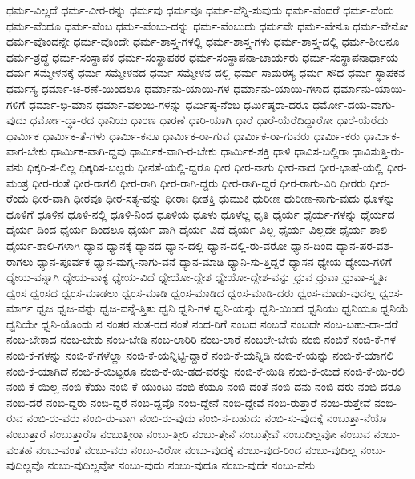 {ಧರ್ಮ-ವಿಲ್ಲದೆ
ಧರ್ಮ-ವೀರ-ರನ್ನು
ಧರ್ಮವು
ಧರ್ಮವೂ
ಧರ್ಮ-ವೆನ್ನಿ-ಸುವುದು
ಧರ್ಮ-ವೆಂದರೆ
ಧರ್ಮ-ವೆಂದು
ಧರ್ಮ-ವೆಂದೂ
ಧರ್ಮ-ವೆಂಬ
ಧರ್ಮ-ವೆಂಬು-ದನ್ನು
ಧರ್ಮ-ವೆಂಬುದು
ಧರ್ಮವೇ
ಧರ್ಮ-ವೇನೂ
ಧರ್ಮ-ವೇನೋ
ಧರ್ಮ-ವೊಂದನ್ನೇ
ಧರ್ಮ-ವೊಂದೇ
ಧರ್ಮ-ಶಾಸ್ತ್ರ-ಗಳಲ್ಲಿ
ಧರ್ಮ-ಶಾಸ್ತ್ರ-ಗಳು
ಧರ್ಮ-ಶಾಸ್ತ್ರ-ದಲ್ಲಿ
ಧರ್ಮ-ಶೀಲನೂ
ಧರ್ಮ-ಶ್ರದ್ಧೆ
ಧರ್ಮ-ಸಂಸ್ಥಾಪಕ
ಧರ್ಮ-ಸಂಸ್ಥಾಪಕರ
ಧರ್ಮ-ಸಂಸ್ಥಾಪನಾ-ಚಾರ್ಯರು
ಧರ್ಮ-ಸಂಸ್ಥಾಪನಾರ್ಥಾಯ
ಧರ್ಮ-ಸಮ್ಮೇಳನಕ್ಕೆ
ಧರ್ಮ-ಸಮ್ಮೇಳನದ
ಧರ್ಮ-ಸಮ್ಮೇಳನ-ದಲ್ಲಿ
ಧರ್ಮ-ಸಾಮರಸ್ಯ
ಧರ್ಮ-ಸೌಧ
ಧರ್ಮ-ಸ್ಥಾಪಕನ
ಧರ್ಮಸ್ಯ
ಧರ್ಮಾ-ಚ-ರಣೆ-ಯಿಂದಲೂ
ಧರ್ಮಾನು-ಯಾಯಿ-ಗಳ
ಧರ್ಮಾನು-ಯಾಯಿ-ಗಳಾದ
ಧರ್ಮಾನು-ಯಾಯಿ-ಗಳಿಗೆ
ಧರ್ಮಾ-ಭಿ-ಮಾನ
ಧರ್ಮಾ-ವಲಂಬಿ-ಗಳನ್ನು
ಧರ್ಮಿಷ್ಠ-ನೆಂಬ
ಧರ್ಮಿಷ್ಠರಾ-ದರೂ
ಧರ್ಮೋ-ದಯ-ವಾಗು-ವುದು
ಧರ್ಮೋ-ದ್ಧಾ-ರದ
ಧಾನಿಯ
ಧಾರಣ
ಧಾರಣೆ
ಧಾರಿ-ಯಾಗಿ
ಧಾರೆ
ಧಾರೆ-ಯೆರೆದಿದ್ದಾರೋ
ಧಾರೆ-ಯೆರೆದು
ಧಾರ್ಮಿಕ
ಧಾರ್ಮಿಕ-ತೆ-ಗಳು
ಧಾರ್ಮಿ-ಕನೂ
ಧಾರ್ಮಿಕ-ರಾ-ಗುವ
ಧಾರ್ಮಿಕ-ರಾ-ಗುವರು
ಧಾರ್ಮಿ-ಕರು
ಧಾರ್ಮಿಕ-ವಾಗ-ಬೇಕು
ಧಾರ್ಮಿಕ-ವಾಗಿ-ದ್ದವು
ಧಾರ್ಮಿಕ-ವಾಗಿ-ರ-ಬೇಕು
ಧಾರ್ಮಿಕ-ಶಕ್ತಿ
ಧಾಳಿ
ಧಾವಿಸ-ಬಲ್ಲಿರಾ
ಧಾವಿಸುತ್ತಿ-ರು-ವನು
ಧಿಕ್ಕರಿ-ಸ-ಲಿಲ್ಲ
ಧಿಕ್ಕರಿಸ-ಬಲ್ಲರು
ಧೀನತೆ-ಯಲ್ಲಿ-ದ್ದರೂ
ಧೀರ
ಧೀರ-ನಾಗು
ಧೀರ-ನಾದ
ಧೀರ-ಭಾಷೆ-ಯಲ್ಲಿ
ಧೀರ-ಮಂತ್ರ
ಧೀರ-ರಂತೆ
ಧೀರ-ರಾಗಲಿ
ಧೀರ-ರಾಗಿ
ಧೀರ-ರಾಗಿ-ದ್ದರು
ಧೀರ-ರಾಗಿ-ದ್ದರೆ
ಧೀರ-ರಾಗು-ವಿರಿ
ಧೀರರು
ಧೀರ-ರೆಂದು
ಧೀರ-ವಾಗಿ
ಧೀರವೂ
ಧೀರ-ಸತ್ಯ-ವನ್ನು
ಧೀರಾಃ
ಧೀಶಕ್ತಿ
ಧುಮುಕಿ
ಧುರೀಣ
ಧುರೀಣ-ನಾಗು-ವುದು
ಧೂಳನ್ನು
ಧೂಳಿಗೆ
ಧೂಳಿನ
ಧೂಳಿ-ನಲ್ಲಿ
ಧೂಳಿ-ನಿಂದ
ಧೂಳಿಯ
ಧೂಳು
ಧೂಳೆಲ್ಲ
ಧೃತಿ
ಧೈರ್ಯ
ಧೈರ್ಯ-ಗಳನ್ನು
ಧೈರ್ಯದ
ಧೈರ್ಯ-ದಿಂದ
ಧೈರ್ಯ-ದಿಂದಲೂ
ಧೈರ್ಯ-ವಾಗಿ
ಧೈರ್ಯ-ವಿದೆ
ಧೈರ್ಯ-ವಿಲ್ಲ
ಧೈರ್ಯ-ವಿಲ್ಲದೇ
ಧೈರ್ಯ-ಶಾಲಿ
ಧೈರ್ಯ-ಶಾಲಿ-ಗಳಾಗಿ
ಧ್ಯಾನ
ಧ್ಯಾನಕ್ಕೆ
ಧ್ಯಾನದ
ಧ್ಯಾನ-ದಲ್ಲಿ
ಧ್ಯಾನ-ದಲ್ಲಿ-ರು-ವರೋ
ಧ್ಯಾನ-ದಿಂದ
ಧ್ಯಾನ-ಪರ-ವಶ-ರಾಗಲು
ಧ್ಯಾನ-ಪೂರ್ವಕ
ಧ್ಯಾನ-ಮಗ್ನ-ನಾಗು-ವನೆ
ಧ್ಯಾನ-ಮಾಡಿ
ಧ್ಯಾನಿ-ಸು-ತ್ತಿದ್ದರೆ
ಧ್ಯಾಸನ
ಧ್ಯೇಯ
ಧ್ಯೇಯ-ಗಳಿಗೆ
ಧ್ಯೇಯ-ವನ್ನಾಗಿ
ಧ್ಯೇಯ-ವಾಕ್ಯ
ಧ್ಯೇಯ-ವಿದೆ
ಧ್ಯೇಯೋ-ದ್ದೇಶ
ಧ್ಯೇಯೋ-ದ್ದೇಶ-ವನ್ನು
ಧ್ರುವ
ಧ್ರುವಾ
ಧ್ರುವಾ-ಸ್ಮೃತಿಃ
ಧ್ವಂಸ
ಧ್ವಂಸದ
ಧ್ವಂಸ-ಮಾಡಲು
ಧ್ವಂಸ-ಮಾಡಿ
ಧ್ವಂಸ-ಮಾಡಿದ
ಧ್ವಂಸ-ಮಾಡಿ-ದರು
ಧ್ವಂಸ-ಮಾಡು-ವುದಲ್ಲ
ಧ್ವಂಸ-ಮಾರ್ಗ
ಧ್ವಜ
ಧ್ವಜ-ವನ್ನು
ಧ್ವಜ-ವನ್ನೆ-ತ್ತಿತು
ಧ್ವನಿ
ಧ್ವನಿ-ಗಳ
ಧ್ವನಿ-ಯನ್ನು
ಧ್ವನಿ-ಯಿಂದ
ಧ್ವನಿಯು
ಧ್ವನಿಯೂ
ಧ್ವನಿಯೆ
ಧ್ವನಿಯೇ
ಧ್ವನಿ-ಯೊಂದು
ನ
ನಂತರ
ನಂತ-ರದ
ನಂತೆ
ನಂದ-ರಿಗೆ
ನಂಬದ
ನಂಬದೆ
ನಂಬದೇ
ನಂಬ-ಬಹು-ದಾ-ದರೆ
ನಂಬ-ಬೇಕಾದ
ನಂಬ-ಬೇಕು
ನಂಬ-ಬೇಡಿ
ನಂಬ-ಲಾರಿರಿ
ನಂಬ-ಲಾರೆ
ನಂಬಲೇ-ಬೇಕು
ನಂಬಿ
ನಂಬಿಕೆ
ನಂಬಿ-ಕೆ-ಗಳ
ನಂಬಿ-ಕೆ-ಗಳನ್ನು
ನಂಬಿ-ಕೆ-ಗಳೆಲ್ಲಾ
ನಂಬಿ-ಕೆ-ಯನ್ನಿಟ್ಟಿ-ದ್ದಾರೆ
ನಂಬಿ-ಕೆ-ಯನ್ನಿಡಿ
ನಂಬಿ-ಕೆ-ಯನ್ನು
ನಂಬಿ-ಕೆ-ಯಾಗಲಿ
ನಂಬಿ-ಕೆ-ಯಾಗಿದೆ
ನಂಬಿ-ಕೆ-ಯಿಟ್ಟರೂ
ನಂಬಿ-ಕೆ-ಯಿ-ಡದ-ವರನ್ನು
ನಂಬಿ-ಕೆ-ಯಿಡಿ
ನಂಬಿ-ಕೆ-ಯಿದೆ
ನಂಬಿ-ಕೆ-ಯಿ-ರಲಿ
ನಂಬಿ-ಕೆ-ಯಿಲ್ಲ
ನಂಬಿ-ಕೆಯು
ನಂಬಿ-ಕೆ-ಯುಂಟು
ನಂಬಿ-ಕೆಯೂ
ನಂಬಿ-ದಂತೆ
ನಂಬಿ-ದನು
ನಂಬಿ-ದರು
ನಂಬಿ-ದರೂ
ನಂಬಿ-ದರೆ
ನಂಬಿ-ದ್ದರು
ನಂಬಿ-ದ್ದರೆ
ನಂಬಿ-ದ್ದವೊ
ನಂಬಿ-ದ್ದೇನೆ
ನಂಬಿ-ದ್ದೇವೆ
ನಂಬಿ-ರುತ್ತಾರೆ
ನಂಬಿ-ರುತ್ತೇವೆ
ನಂಬಿ-ರುವ
ನಂಬಿ-ರು-ವರು
ನಂಬಿ-ರು-ವಾಗ
ನಂಬಿ-ರು-ವುದು
ನಂಬಿ-ಸ-ಬಹುದು
ನಂಬಿ-ಸು-ವುದಕ್ಕೆ
ನಂಬುತ್ತಾ-ನೆಯೊ
ನಂಬುತ್ತಾರೆ
ನಂಬುತ್ತಾರೊ
ನಂಬುತ್ತೀರಾ
ನಂಬು-ತ್ತೀರಿ
ನಂಬು-ತ್ತೇನೆ
ನಂಬುತ್ತೇವೆ
ನಂಬುದಿಲ್ಲವೋ
ನಂಬುವ
ನಂಬು-ವಂತಹ
ನಂಬು-ವಂತೆ
ನಂಬು-ವರು
ನಂಬು-ವಿರೋ
ನಂಬು-ವುದಕ್ಕೆ
ನಂಬು-ವುದ-ರಿಂದ
ನಂಬು-ವುದಿಲ್ಲ
ನಂಬು-ವುದಿಲ್ಲವೊ
ನಂಬು-ವುದಿಲ್ಲವೋ
ನಂಬು-ವುದು
ನಂಬು-ವುದೂ
ನಂಬು-ವುದೇ
ನಂಬು-ವೆನು
}
